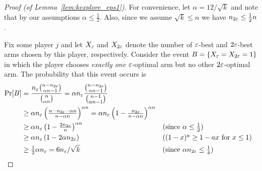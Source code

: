 \documentclass{article} %
\begin{document}
\begin{proof}[Proof (of Lemma~\ref{lem:kexplore_eps1})]
For convenience, let $\alpha = 12/\sqrt{k}$ and note that by our assumptions $\alpha \le \tfrac{1}{2}$.
Also, since we assume $\sqrt{k} \le n$ we have $n_{2\varepsilon} \le \tfrac{1}{2}n$.

Fix some player $j$ and let $X_{\varepsilon}$ and $X_{2\varepsilon}$ denote the number of $\varepsilon$-best and $2\varepsilon$-best arms chosen by this player, respectively. 
Consider the event $B = \{X_{\varepsilon} = X_{2\varepsilon} = 1\}$ in which the player chooses \emph{exactly one} $\varepsilon$-optimal arm but no other $2\varepsilon$-optimal arm.
The probability that this event occurs is
\begin{align*}
	\Pr[B]
	&= \frac{n_{\eps} {n - n_{2\eps} \choose \alpha n - 1}}
		{{n \choose \alpha n}}
	= \alpha n_{\eps} \frac{{n - n_{2\eps} \choose \alpha n - 1}}
		{{n-1 \choose \alpha n - 1}} \\
	&\ge \alpha n_{\eps} \left( \tfrac{n - n_{2\eps} - \alpha n}{n-\alpha n} \right)^{\alpha n}
	= \alpha n_{\eps} \left( 1 - \tfrac{n_{2\eps}}{n-\alpha n} \right)^{\alpha n} \\
	&\ge \alpha n_{\eps} \left( 1 - \tfrac{2 n_{2\eps}}{n} \right)^{\alpha n} %
		&&\mbox{(since $\alpha \le \tfrac{1}{2}$)} \\
	&\ge \alpha n_{\eps} \left( 1- 2 \alpha n_{2\eps} \right) %
		&&\mbox{($(1-x)^a \ge 1-ax$ for $x \le 1$)} \\
	&\ge \tfrac{1}{2}\alpha n_{\eps} = 6 n_{\eps}/\sqrt{k} %
		&&\mbox{(since $\alpha n_{2\eps} \le \frac{1}{4}$)}
\end{align*}


\end{proof}
\end{document}
